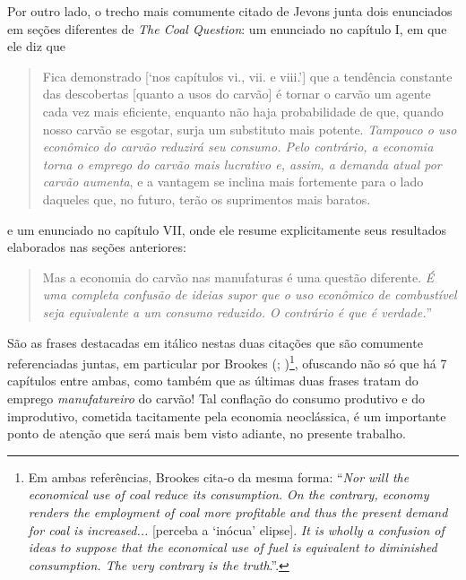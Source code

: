 Por outro lado, o trecho mais comumente citado de Jevons junta dois enunciados em seções diferentes de \textit{The Coal Question}: um enunciado no capítulo I, em que ele diz que
\begin{quote}
    Fica demonstrado [`nos capítulos vi., vii. e viii.'] que a tendência constante das descobertas [quanto a usos do carvão] é tornar o carvão um agente cada vez mais eficiente, enquanto não haja probabilidade de que, quando nosso carvão se esgotar, surja um substituto mais potente. \textit{Tampouco o uso econômico do carvão reduzirá seu consumo. Pelo contrário, a economia torna o emprego do carvão mais lucrativo e, assim, a demanda atual por carvão aumenta}, e a vantagem se inclina mais fortemente para o lado daqueles que, no futuro, terão os suprimentos mais baratos. \parencite[p. 17, grifo meu]{Jevons1866}
\end{quote}
e um enunciado no capítulo VII, onde ele resume explicitamente seus resultados elaborados nas seções anteriores:
\begin{quote}
    Mas a economia do carvão nas manufaturas é uma questão diferente. \textit{É uma completa confusão de ideias supor que o uso econômico de combustível seja equivalente a um consumo reduzido. O contrário é que é verdade.}'' \parencite[p. 75, grifo meu]{Jevons1866}
\end{quote}

São as frases destacadas em itálico nestas duas citações que são comumente referenciadas juntas, em particular por Brookes (\citeyear*[p. 319]{Brookes1990}; \citeyear*[p. 357, n. 8]{Brookes2000})\footnote{Em ambas referências, Brookes cita-o da mesma forma: ``\textit{Nor will the economical use of coal reduce its consumption. On the contrary, economy renders the employment of coal more profitable and thus the present demand for coal is increased...} [perceba a `inócua' elipse]. \textit{It is wholly a confusion of ideas to suppose that the economical use of fuel is equivalent to diminished consumption. The very contrary is the truth}.''.}, ofuscando não só que há 7 capítulos entre ambas, como também que as últimas duas frases tratam do emprego \textit{manufatureiro} do carvão! Tal conflação do consumo produtivo e do improdutivo, cometida tacitamente pela economia neoclássica, é um importante ponto de atenção que será mais bem visto adiante, no presente trabalho. 


